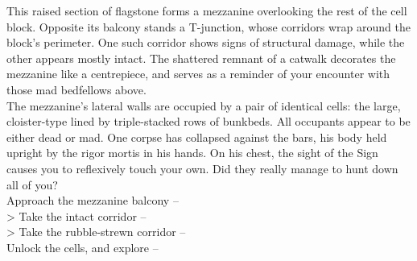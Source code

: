 This raised section of flagstone forms a mezzanine overlooking the rest of the cell block. Opposite its balcony stands a T-junction, whose corridors wrap around the block’s perimeter. One such corridor shows signs of structural damage, while the other appears mostly intact. The shattered remnant of a catwalk decorates the mezzanine like a centrepiece, and serves as a reminder of your encounter with those mad bedfellows above.\\

The mezzanine's lateral walls are occupied by a pair of identical cells: the large, cloister-type lined by triple-stacked rows of bunkbeds. All occupants appear to be either dead or mad. One corpse has collapsed against the bars, his body held upright by the rigor mortis in his hands. On his chest, the sight of the Sign causes you to reflexively touch your own. Did they really manage to hunt down all of you?\\

 Approach the mezzanine balcony -- \\
> Take the intact corridor -- \\
> Take the rubble-strewn corridor -- \\
 Unlock the cells, and explore -- 